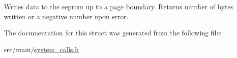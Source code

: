 Writes data to the eeprom up to a page boundary. Returns number of bytes written or a negative number upon error. 

The documentation for this struct was generated from the following file\+:\begin{DoxyCompactItemize}
\item 
src/main/\hyperlink{system__calls_8h}{system\+\_\+calls.\+h}\end{DoxyCompactItemize}
